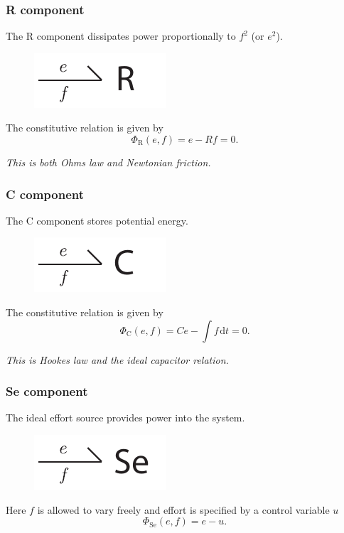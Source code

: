 \documentclass[11pt,reqno]{beamer}
\newcommand{\df}[1]{\mspace{2mu}  \mathrm{d}#1}
\begin{document}
\begin{frame}
\frametitle{R component}
The R component dissipates power proportionally to $f^2$ (or $e^2$).
\begin{figure}
	\includegraphics{oneport-R.pdf}
\end{figure}
The constitutive relation is given by
\[
\Phi_\text{R}(e,f) = e - Rf = 0.
\]
\vspace{10pt}

\begin{center}
\emph{This is both Ohms law and Newtonian friction.}
\end{center}
\end{frame}
\begin{frame}
\frametitle{C component}
The C component stores potential energy.
\begin{figure}
	\includegraphics{oneport-C.pdf}
\end{figure}
The constitutive relation is given by
\[
\Phi_\text{C}(e,f) = Ce - \int f \df{t} = 0.
\]
\vspace{10pt}

\begin{center}
\emph{This is Hookes law and the ideal capacitor relation.}
\end{center}
\end{frame}
\begin{frame}
\frametitle{Se component}
The ideal effort source provides power into the system.
\begin{figure}
\includegraphics{oneport-Se.pdf}
\end{figure}
Here $f$ is allowed to vary freely and effort is specified by a control variable $u$
\[
\Phi_\text{Se}(e,f) = e - u.
\]

\end{frame}
\end{document}
